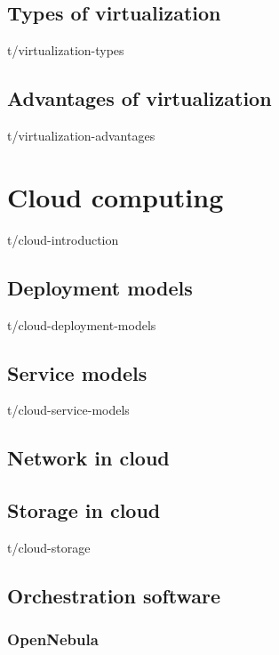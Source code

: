 \documentclass[12pt,oneside,a4paper]{report} %
\begin{document}
		\subsection{Types of virtualization}
		{t/virtualization-types}

		\subsection{Advantages of virtualization}
		{t/virtualization-advantages}
		\label{subsec:advantages-of-virtualization}

	\section{Cloud computing}
		{t/cloud-introduction}

		\subsection{Deployment models}
		{t/cloud-deployment-models}

		\subsection{Service models}
		{t/cloud-service-models}


		\subsection{Network in cloud}

		\subsection{Storage in cloud}
		{t/cloud-storage}

		



		\subsection{Orchestration software}
			
			\subsubsection{OpenNebula}
\end{document}
